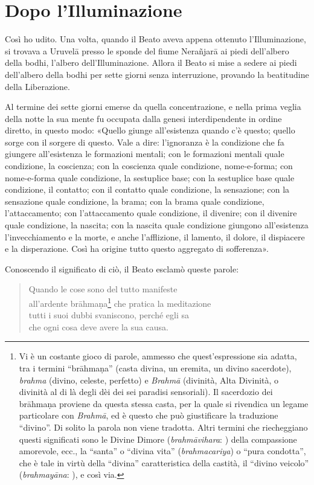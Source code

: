 \chapter{Dopo l’Illuminazione}

 Così ho udito. Una volta, quando il Beato aveva appena
ottenuto l’Illuminazione, si trovava a Uruvelā presso le sponde del fiume
Nerañjarā ai piedi dell’albero della bodhi, l’albero dell’Illuminazione. Allora
il Beato si mise a sedere ai piedi dell’albero della bodhi per sette giorni
senza interruzione, provando la beatitudine della Liberazione.

Al termine dei sette giorni emerse da quella concentrazione, e nella prima
veglia della notte la sua mente fu occupata dalla genesi interdipendente in
ordine diretto, in questo modo: «Quello giunge all’esistenza quando c’è questo;
quello sorge con il sorgere di questo. Vale a dire: l’ignoranza è la condizione
che fa giungere all’esistenza le formazioni mentali; con le formazioni mentali
quale condizione, la coscienza; con la coscienza quale condizione, nome-e-forma;
con nome-e-forma quale condizione, la sestuplice base; con la sestuplice base
quale condizione, il contatto; con il contatto quale condizione, la sensazione;
con la sensazione quale condizione, la brama; con la brama quale condizione,
l’attaccamento; con l’attaccamento quale condizione, il divenire; con il
divenire quale condizione, la nascita; con la nascita quale condizione giungono
all’esistenza l’invecchiamento e la morte, e anche l’afflizione, il lamento, il
dolore, il dispiacere e la disperazione. Così ha origine tutto questo aggregato
di sofferenza».

Conoscendo il significato di ciò, il Beato esclamò queste parole:

\begin{quote}
Quando le cose sono del tutto manifeste \\
all’ardente brāhmaṇa\footnote{Vi è un costante gioco di parole, ammesso che quest’espressione sia adatta, tra i termini “brāhmaṇa” (casta divina, un eremita, un divino sacerdote), \emph{brahma} (divino, celeste, perfetto) e \emph{Brahmā} (divinità, Alta Divinità, o divinità al di là degli dèi dei sei paradisi sensoriali). Il sacerdozio dei brāhmaṇa proviene da questa stessa casta, per la quale si rivendica un legame particolare con \emph{Brahmā}, ed è questo che può giustificare la traduzione “divino”. Di solito la parola non viene tradotta. Altri termini che riecheggiano questi significati sono le Divine Dimore (\emph{brahmāvihara}: \hyperlink{cap-10-Il-periodo-di-mezzo#pag200}{}) della compassione amorevole, ecc., la “santa” o “divina vita” (\emph{brahmacariya}) o “pura condotta”, che è tale in virtù della “divina” caratteristica della castità, il “divino veicolo” (\emph{brahmayāna}: \hyperlink{cap-12-La-Dottrina#pag281}{}), e così via.} che pratica la meditazione \\
tutti i suoi dubbi svaniscono, perché egli sa \\
che ogni cosa deve avere la sua causa.
\end{quote}

